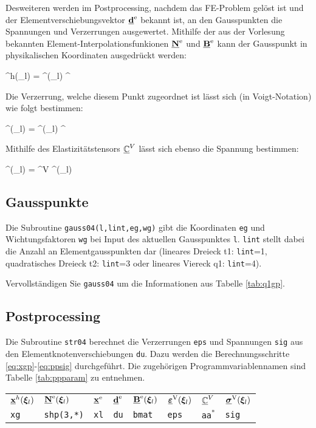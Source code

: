 Desweiteren werden im Postprocessing, nachdem das FE-Problem gelöst ist und der Elementverschiebungsvektor $\underline{{\bm{\mathrm{d}}}}^{\mathrm{e}}$ bekannt ist, an den Gausspunkten die Spannungen und Verzerrungen ausgewertet.
Mithilfe der aus der Vorlesung bekannten Element-Interpolationsfunkionen $\underline{{\bm{\mathrm{N}}}}^{\mathrm{e}}$ und $\underline{{\bm{\mathrm{B}}}}^{\mathrm{e}}$ kann der Gausspunkt in physikalischen Koordinaten ausgedrückt werden:

\eb
\mx^h(\Bxi_l) = \mN^{}(\Bxi_l) \mx^{}
\label{eq:xgp}
\ee

Die Verzerrung, welche diesem Punkt zugeordnet ist lässt sich (in Voigt-Notation) wie folgt bestimmen:

\eb
\Mvarepsilon^{}(\Bxi_l) = \mB^{}(\Bxi_l) \md^{}
\label{eq:ppeps}
\ee

Mithilfe des Elastizitätstensors $\underline{\mathbb{C}}^V$ lässt sich ebenso die Spannung bestimmen:

\eb
\Msigma^{}(\Bxi_l) = \mIC^V \Mvarepsilon^{}(\Bxi_l)
\label{eq:ppsig}
\ee
%
\subsection{Gausspunkte}

Die Subroutine \verb|gauss04(l,lint,eg,wg)| gibt die Koordinaten \verb|eg| und Wichtungsfaktoren \verb|wg| bei Input des aktuellen Gausspunktes \verb|l|.
\verb|lint| stellt dabei die Anzahl an Elementgausspunkten dar (lineares Dreieck t1: \verb|lint|=1, quadratisches Dreieck t2: \verb|lint|=3 oder lineares Viereck q1: \verb|lint|=4).
%
\enab
\item Vervollständigen Sie \verb|gauss04| um die Informationen aus Tabelle \ref{tab:q1gp}.
\enae
%
\subsection{Postprocessing}

Die Subroutine \verb|str04| berechnet die Verzerrungen \verb|eps| und Spannungen \verb|sig| aus den Elementknotenverschiebungen \verb|du|.
Dazu werden die Berechnungsschritte \eqref{eq:xgp}-\eqref{eq:ppsig} durchgeführt. 
Die zugehörigen Programmvariablennamen sind Tabelle \ref{tab:ppparam} zu entnehmen.


{\center
\begin{tabular}{llllllll}
\toprule
 $\underline{{\bm{\mathrm{x}}}}^h({\bm{\xi }}_l)$                   & 
 $\underline{{\bm{\mathrm{N}}}}^{\mathrm{e}}({\bm{\xi }}_l)$           & 
  $\underline{{\bm{\mathrm{x}}}}^{\mathrm{e}}$                  & 
  $\underline{{\bm{\mathrm{d}}}}^{\mathrm{e}}$                  &
  $\underline{{\bm{\mathrm{B}}}}^{\mathrm{e}}({\bm{\xi }}_l)$          &
 $\underline{\bm{\varepsilon }}^{\mathrm{V}}({\bm{\xi }}_l)$  &
 $\underline{\mathbb{C}}^V$                          &
 $\underline{\bm{\sigma }}^{\mathrm{V}}({\bm{\xi }}_l)$       \\
  \verb|xg| & \verb|shp(3,*)| & \verb|xl| & \verb|du| & \verb|bmat| & \verb|eps| & \verb|aa|$^*$ & \verb|sig|   
\\\midrule
\end{tabular}
\label{tab:ppparam}
}\medskip

